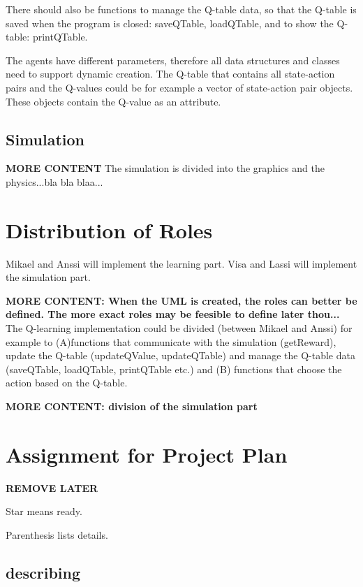 \documentclass{article}
\begin{document}
There should also be functions to manage the Q-table data, so that the Q-table is
saved when the program is closed: saveQTable, loadQTable, and to show the Q-table:
printQTable.

The agents have different parameters, therefore all data structures and classes
need to support dynamic creation. The Q-table that contains all state-action pairs
and the Q-values could be for example a vector of state-action pair objects. These
objects contain the Q-value as an attribute.


\subsection{Simulation}
\textbf{MORE CONTENT}
The simulation is divided into the graphics and the physics...bla bla blaa...



\section{Distribution of Roles}
Mikael and Anssi will implement the learning part.
Visa and Lassi will implement the simulation part.

\textbf{MORE CONTENT: When the UML is created, the roles can better be defined.
  The more exact roles may be feesible to define later thou...}
The Q-learning implementation could be divided (between Mikael and Anssi) for
example to (A)functions that communicate with the simulation (getReward), update
the Q-table (updateQValue, updateQTable) and manage the Q-table data (saveQTable,
loadQTable, printQTable etc.) and (B) functions that choose the action based on
the Q-table.

\textbf{MORE CONTENT: division of the simulation part}

\newpage



\section{Assignment for Project Plan}
\textbf{REMOVE LATER}

Star means ready.

Parenthesis lists details.

\subsection{describing}
\end{document}
